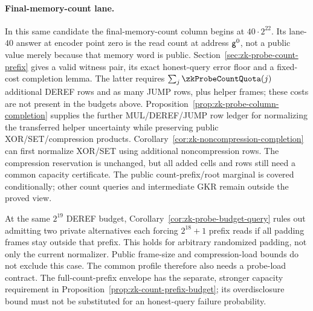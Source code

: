 \paragraph{Final-memory-count lane.} In this same candidate the final-memory-count column begins at $40\cdot2^{22}$. Its lane-$40$ answer at encoder point zero is the read count at address $\mathsf{g}^0$, not a public value merely because that memory word is public. Section~\ref{sec:zk-probe-count-prefix} gives a valid witness pair, its exact honest-query error floor and a fixed-cost completion lemma. The latter requires $\sum_j\zkProbeCountQuota(j)$ additional DEREF rows and as many JUMP rows, plus helper frames; these costs are not present in the budgets above. Proposition~\ref{prop:zk-probe-column-completion} supplies the further MUL/DEREF/JUMP row ledger for normalizing the transferred helper uncertainty while preserving public XOR/SET/compression products. Corollary~\ref{cor:zk-noncompression-completion} can first normalize XOR/SET using additional noncompression rows. The compression reservation is unchanged, but all added cells and rows still need a common capacity certificate. The public count-prefix/root marginal is covered conditionally; other count queries and intermediate GKR remain outside the proved view.

At the same $2^{19}$ DEREF budget, Corollary~\ref{cor:zk-probe-budget-query} rules out admitting two private alternatives each forcing $2^{18}+1$ prefix reads if all padding frames stay outside that prefix. This holds for arbitrary randomized padding, not only the current normalizer. Public frame-size and compression-load bounds do not exclude this case. The common profile therefore also needs a probe-load contract. The full-count-prefix envelope has the separate, stronger capacity requirement in Proposition~\ref{prop:zk-count-prefix-budget}; its overdisclosure bound must not be substituted for an honest-query failure probability.
